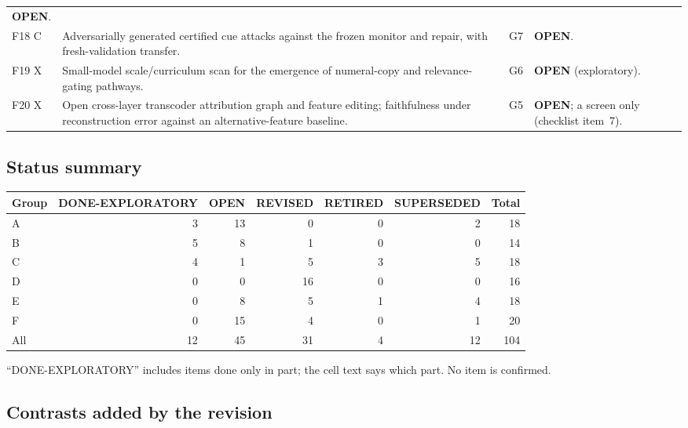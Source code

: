 \documentclass[10pt,a4paper]{article}
\begin{document}
\begin{longtable}{@{}P{1.2cm}P{7.2cm}P{1.3cm}P{5.6cm}@{}}
\textbf{OPEN}. \\
F18 \newline C & Adversarially generated certified cue attacks against the frozen monitor and repair, with fresh-validation transfer. & G7 &
\textbf{OPEN}. \\
F19 \newline X & Small-model scale/curriculum scan for the emergence of numeral-copy and relevance-gating pathways. & G6 &
\textbf{OPEN} (exploratory). \\
F20 \newline X & Open cross-layer transcoder attribution graph and feature editing; faithfulness under reconstruction error against an alternative-feature baseline. & G5 &
\textbf{OPEN}; a screen only (checklist item~7). \\
\end{longtable}
\endgroup

\subsection{Status summary}
\label{sec:inv-summary}

\begin{center}\small
\begin{tabular}{@{}lrrrrrr@{}}
\toprule
Group & DONE-EXPLORATORY & OPEN & REVISED & RETIRED & SUPERSEDED & Total \\
\midrule
A & 3 & 13 & 0 & 0 & 2 & 18 \\
B & 5 & 8 & 1 & 0 & 0 & 14 \\
C & 4 & 1 & 5 & 3 & 5 & 18 \\
D & 0 & 0 & 16 & 0 & 0 & 16 \\
E & 0 & 8 & 5 & 1 & 4 & 18 \\
F & 0 & 15 & 4 & 0 & 1 & 20 \\
\midrule
All & 12 & 45 & 31 & 4 & 12 & 104 \\
\bottomrule
\end{tabular}
\end{center}

``DONE-EXPLORATORY'' includes items done only in part; the cell text says which part. No item is confirmed.

\subsection{Contrasts added by the revision}
\label{sec:inv-added}
\end{document}
